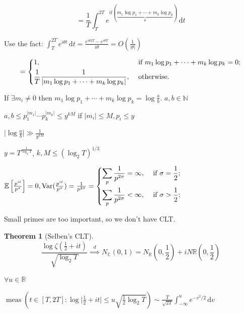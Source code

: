 \documentclass{article}
\theoremstyle{definition}
\newtheorem{theorem}{Theorem}
\begin{document}
    \[
        = \frac{1}{T} \int_{T}^{2T} e^{it (\underbrace{m_1 \log p_1 + \cdots + m_k \log p_k}_{\theta})} \,\mathrm{d}t 
    \]

    Use the fact: \(\int_{T}^{2T} e^{i \theta t} \,\mathrm{d}t = \frac{e^{i \theta 2T} - e^{i \theta T}}{i \theta} = O(\frac{1}{\vert \theta \vert})\) 

    \[
        = \begin{dcases}
            1, &\text{ if } m_1 \log  p_1 + \cdots + m_k \log p_k = 0 ;\\
            \frac{1}{T} \frac{1}{\vert m_1 \log p_1 + \cdots + m_k \log p_k \vert}, &\text{ otherwise} .
        \end{dcases}
    \]

    If \(\exists m_i \neq 0\) then \(m_1 \log p_1 + \cdots + m_k \log p_k = \log \frac{a}{b}\). \(a,b\in \mathbb{N}\)
    
    \(a,b \leq p_1^{\vert m_1 \vert} \cdots p_k^{\vert m_k \vert} \leq y^{kM}\) if \(\vert m_i \vert \leq M, p_i \leq y\)
    
    \(\vert \log \frac{a}{b} \vert \gg \frac{1}{y^{kM}}\) 

    \(y = T^{\frac{1}{\log _2 T}}\), \(k,M \leq (\log_2 T)^{1 / 3}\)  

    \(\mathbb{E} \left[ \frac{p^{it}}{p^\sigma} \right] = 0, \operatorname{Var} (\frac{p^{it}}{p^\sigma}) = \frac{1}{p^{2\sigma}} = \begin{dcases}
        \sum_{p} \frac{1}{p^{2\sigma}} = \infty, &\text{ if } \sigma = \frac{1}{2} ;\\
        \sum_{p} \frac{1}{p^{2\sigma}} < \infty, &\text{ if } \sigma > \frac{1}{2} ;
    \end{dcases}\) 

    Small primes are too important, so we don't have CLT.

    \begin{theorem}
        [Selben's CLT]

        \[
            \frac{\log \zeta (\frac{1}{2} + it)}{\sqrt{\log_2 T}} \overset{d}{\implies} N_\mathbb{C}(0,1) = N_{\mathbb{R}}(0,\frac{1}{2}) + i N{\mathbb{R}}(0,\frac{1}{2})
        \]

    \end{theorem}

    \(\forall u\in \mathbb{R}\)

    \(\operatorname{meas} \left( t\in [T,2T] : \log \vert \frac{1}{2} + it \vert \leq u \sqrt{\frac{1}{2} \log_2 T}  \right) \sim \frac{T}{\sqrt{2T}} \int_{-\infty}^{u} e^{-v^2 / 2} \,\mathrm{d}v\) 
\end{document}
